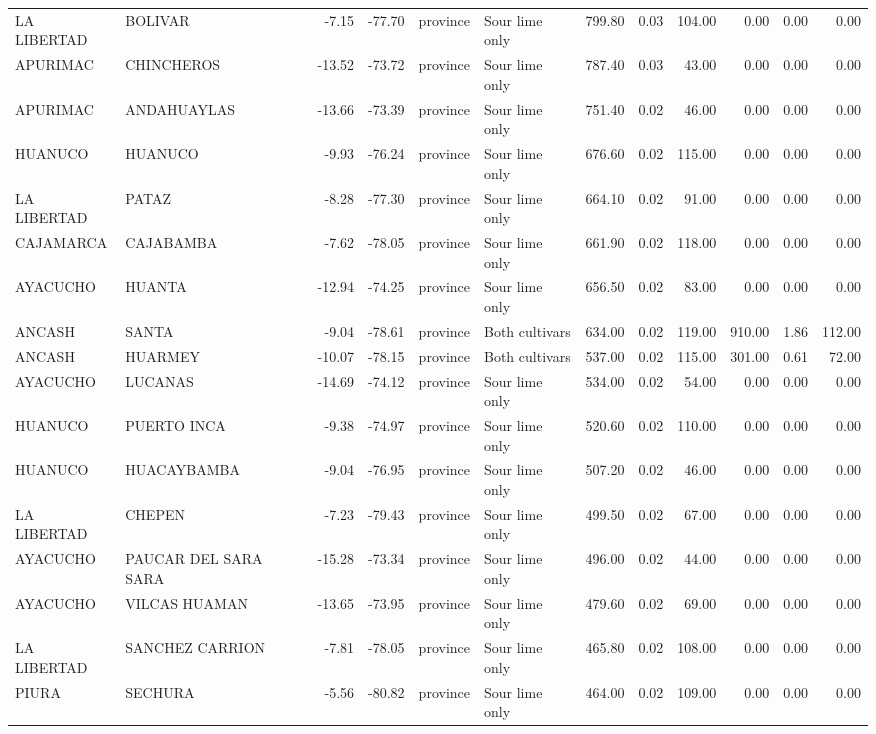 \begin{longtable}{llrrllrrrrrr}
LA LIBERTAD & BOLIVAR & -7.15 & -77.70 & province & Sour lime only & 799.80 & 0.03 & 104.00 & 0.00 & 0.00 & 0.00 \\
APURIMAC & CHINCHEROS & -13.52 & -73.72 & province & Sour lime only & 787.40 & 0.03 & 43.00 & 0.00 & 0.00 & 0.00 \\
APURIMAC & ANDAHUAYLAS & -13.66 & -73.39 & province & Sour lime only & 751.40 & 0.02 & 46.00 & 0.00 & 0.00 & 0.00 \\
HUANUCO & HUANUCO & -9.93 & -76.24 & province & Sour lime only & 676.60 & 0.02 & 115.00 & 0.00 & 0.00 & 0.00 \\
LA LIBERTAD & PATAZ & -8.28 & -77.30 & province & Sour lime only & 664.10 & 0.02 & 91.00 & 0.00 & 0.00 & 0.00 \\
CAJAMARCA & CAJABAMBA & -7.62 & -78.05 & province & Sour lime only & 661.90 & 0.02 & 118.00 & 0.00 & 0.00 & 0.00 \\
AYACUCHO & HUANTA & -12.94 & -74.25 & province & Sour lime only & 656.50 & 0.02 & 83.00 & 0.00 & 0.00 & 0.00 \\
ANCASH & SANTA & -9.04 & -78.61 & province & Both cultivars & 634.00 & 0.02 & 119.00 & 910.00 & 1.86 & 112.00 \\
ANCASH & HUARMEY & -10.07 & -78.15 & province & Both cultivars & 537.00 & 0.02 & 115.00 & 301.00 & 0.61 & 72.00 \\
AYACUCHO & LUCANAS & -14.69 & -74.12 & province & Sour lime only & 534.00 & 0.02 & 54.00 & 0.00 & 0.00 & 0.00 \\
HUANUCO & PUERTO INCA & -9.38 & -74.97 & province & Sour lime only & 520.60 & 0.02 & 110.00 & 0.00 & 0.00 & 0.00 \\
HUANUCO & HUACAYBAMBA & -9.04 & -76.95 & province & Sour lime only & 507.20 & 0.02 & 46.00 & 0.00 & 0.00 & 0.00 \\
LA LIBERTAD & CHEPEN & -7.23 & -79.43 & province & Sour lime only & 499.50 & 0.02 & 67.00 & 0.00 & 0.00 & 0.00 \\
AYACUCHO & PAUCAR DEL SARA SARA & -15.28 & -73.34 & province & Sour lime only & 496.00 & 0.02 & 44.00 & 0.00 & 0.00 & 0.00 \\
AYACUCHO & VILCAS HUAMAN & -13.65 & -73.95 & province & Sour lime only & 479.60 & 0.02 & 69.00 & 0.00 & 0.00 & 0.00 \\
LA LIBERTAD & SANCHEZ CARRION & -7.81 & -78.05 & province & Sour lime only & 465.80 & 0.02 & 108.00 & 0.00 & 0.00 & 0.00 \\
PIURA & SECHURA & -5.56 & -80.82 & province & Sour lime only & 464.00 & 0.02 & 109.00 & 0.00 & 0.00 & 0.00 \\

\end{longtable}
